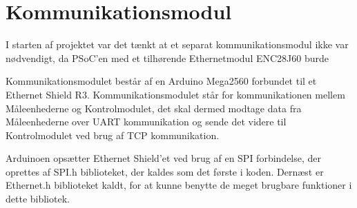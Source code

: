 
\section{Kommunikationsmodul}
\label{Kommunikationsmodul}

I starten af projektet var det tænkt at et separat kommunikationsmodul ikke var nødvendigt, da PSoC'en med et tilhørende Ethernetmodul ENC28J60 burde 

Kommunikationsmodulet består af en Arduino Mega2560 forbundet til et Ethernet Shield R3. Kommunikationsmodulet står for kommunikationen mellem Måleenhederne og Kontrolmodulet, det skal dermed modtage data fra Måleenhederne over UART kommunikation og sende det videre til Kontrolmodulet ved brug af TCP kommunikation. 

Arduinoen opsætter Ethernet Shield'et ved brug af en SPI forbindelse, der oprettes af SPI.h biblioteket, der kaldes som det første i koden. Dernæst er Ethernet.h biblioteket kaldt, for at kunne benytte de meget brugbare funktioner i dette bibliotek. 
